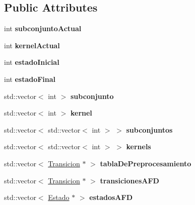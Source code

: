\subsection*{Public Attributes}
\begin{DoxyCompactItemize}
\item 
\mbox{\label{class_subconjunto_a147b97904b1be2166a6a7c3e7df4ca40}} 
int {\bfseries subconjunto\+Actual}
\item 
\mbox{\label{class_subconjunto_afd9f7d586b78d9e9dde1679af83acbd1}} 
int {\bfseries kernel\+Actual}
\item 
\mbox{\label{class_subconjunto_a3f31f16cb2b059e873a41826e79c2258}} 
int {\bfseries estado\+Inicial}
\item 
\mbox{\label{class_subconjunto_a7df53981299ccd070eb8925e5c9f6c11}} 
int {\bfseries estado\+Final}
\item 
\mbox{\label{class_subconjunto_aa269f937b2c2306027018f85be234ccb}} 
std\+::vector$<$ int $>$ {\bfseries subconjunto}
\item 
\mbox{\label{class_subconjunto_af998bdf12250626d28aeb6f46d9021b1}} 
std\+::vector$<$ int $>$ {\bfseries kernel}
\item 
\mbox{\label{class_subconjunto_a0f8d6f77983b276e95ba8bd402c083ef}} 
std\+::vector$<$ std\+::vector$<$ int $>$ $>$ {\bfseries subconjuntos}
\item 
\mbox{\label{class_subconjunto_a85db03a72d8fdfe8e8ca59b4f24b7aa7}} 
std\+::vector$<$ std\+::vector$<$ int $>$ $>$ {\bfseries kernels}
\item 
\mbox{\label{class_subconjunto_ad733400257e13969adfc5f6207b6efc3}} 
std\+::vector$<$ \hyperlink{class_transicion}{Transicion} $\ast$ $>$ {\bfseries tabla\+De\+Preprocesamiento}
\item 
\mbox{\label{class_subconjunto_a3f72e5c3e993579b45c42632832e510e}} 
std\+::vector$<$ \hyperlink{class_transicion}{Transicion} $\ast$ $>$ {\bfseries transiciones\+A\+FD}
\item 
\mbox{\label{class_subconjunto_ae1a8fcdc330e2b7d71538758b6e6eb2e}} 
std\+::vector$<$ \hyperlink{class_estado}{Estado} $\ast$ $>$ {\bfseries estados\+A\+FD}
\end{DoxyCompactItemize}


